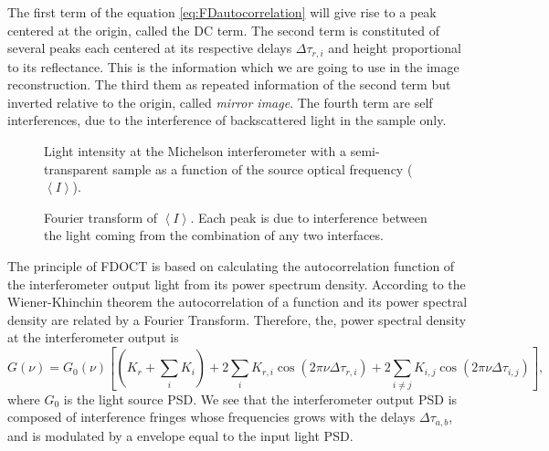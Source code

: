 \documentclass[12pt,twoside,english]{book}
\renewcommand{\~}{\perispomeni}%
\numberwithin{equation}{section}
\numberwithin{figure}{section}
\begin{document}
The first term of the equation \ref{eq:FDautocorrelation} will give rise to a peak centered at the origin, called the DC term. The second term is constituted of several peaks each centered at its respective delays $\Delta\tau_{r,i}$ and height proportional to its reflectance. This is the information which we are going to use in the image reconstruction.
The third them as repeated information of the second term but inverted relative to the origin, called \emph{mirror image}. The fourth term are self interferences, due to the interference of backscattered light in the sample only.

%
\begin{figure}[h]
%
\begin{minipage}[t]{0.48\columnwidth}%
\caption{Light intensity at the Michelson interferometer with a semi-transparent sample as a function of the source optical frequency ($\left<I\right>$). \label{fig:graphics interference bi-layer}}
%
\end{minipage}\hfill{}%
\begin{minipage}[t]{0.48\columnwidth}%
\caption{Fourier transform of $\left<I\right>$. Each peak is due to interference between the light coming from the combination of any two interfaces. \label{fig:ft graph interferometer bi-layer}}
%
\end{minipage}
\end{figure}

The principle of \gls{FDOCT} is based on calculating the autocorrelation function of the interferometer output light from its power spectrum density. According to the Wiener-Khinchin theorem the autocorrelation of a function and its power spectral density are related by a Fourier Transform. Therefore, the, power spectral density at the interferometer output is
\begin{equation}
G\left(\nu\right)=G_{0}\left(\nu\right)\left[\left(K_{r}+\sum_{i}K_{i}\right)+2\sum_{i}K_{r,i}\cos\left(2\pi\nu\Delta\tau_{r,i}\right)+2\sum_{i\ne j}K_{i,j}\cos\left(2\pi\nu\Delta\tau_{i,j}\right)\right],
\label{eq:FDOCT output spectrum}
\end{equation}
where $G_{0}$ is the light source \gls{PSD}. We see that the interferometer output \gls{PSD} is composed of interference fringes whose frequencies grows with the delays $\Delta\tau_{a,b}$, and is modulated by a envelope equal to the input light \gls{PSD}.
\end{document}
